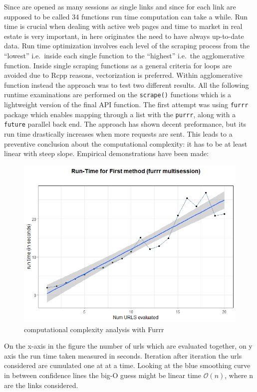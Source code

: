 \documentclass[
  12pt,
  a4paper,
  oneside]{book}
\theoremstyle{definition}
\theoremstyle{definition}
\theoremstyle{definition}
\theoremstyle{remark}
\begin{document}
Since are opened as many sessions as single links and since for each link are supposed to be called 34 functions run time computation can take a while. Run time is crucial when dealing with active web pages and time to market in real estate is very important, in here originates the need to have always up-to-date data. Run time optimization involves each level of the scraping process from the ``lowest'' i.e.~inside each single function to the ``highest'' i.e.~the agglomerative function. Inside single scraping functions as a general criteria for loops are avoided due to Rcpp reasons, vectorization is preferred. Within agglomerative function instead the approach was to test two different results. All the following runtime examinations are performed on the \texttt{scrape()} functions which is a lightweight version of the final API function.
The first attempt was using \texttt{furrr} package \citep{furrr} which enables mapping through a list with the \texttt{purrr}, along with a \texttt{future} parallel back end. The approach has shown decent preformance, but its run time drastically increases when more requests are sent. This leads to a preventive conclusion about the computational complexity: it has to be at least linear with steep slope. Empirical demonstrations have been made:

\begin{figure}
\centering
\includegraphics{images/run_timefurrr.png}
\caption{computational complexity analysis with Furrr}
\end{figure}

On the x-axis in the figure the number of urls which are evaluated together, on y axis the run time taken measured in seconds. Iteration after iteration the urls considered are cumulated one at at a time. Looking at the blue smoothing curve in between confidence lines the big-O guess might be linear time \(\mathcal{O}(n)\), where n are the links considered.
\end{document}
